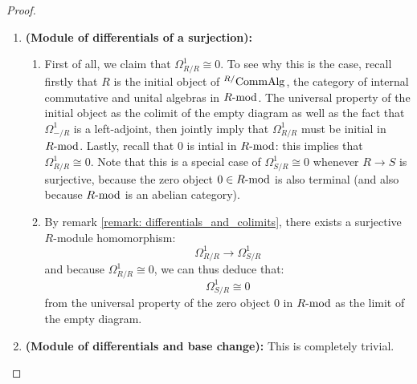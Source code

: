                 \begin{proof}
                    \noindent
                    \begin{enumerate}
                        \item \textbf{(Module of differentials of a surjection):} 
                            \begin{enumerate}
                                \item First of all, we claim that $\Omega^1_{R/R} \cong 0$. To see why this is the case, recall firstly that $R$ is the initial object of ${}^{R/}\Comm\Alg$, the category of internal commutative and unital algebras in $R\mod$. The universal property of the initial object as the colimit of the empty diagram as well as the fact that $\Omega^1_{-/R}$ is a left-adjoint, then jointly imply that $\Omega^1_{R/R}$ must be initial in $R\mod$. Lastly, recall that $0$ is intial in $R\mod$: this implies that $\Omega^1_{R/R} \cong 0$. Note that this is a special case of $\Omega^1_{S/R} \cong 0$ whenever $R \to S$ is surjective, because the zero object $0 \in R\mod$ is also terminal (and also because $R\mod$ is an abelian category).
                                \item By remark \ref{remark: differentials_and_colimits}, there exists a surjective $R$-module homomorphism:
                                    $$\Omega^1_{R/R} \to \Omega^1_{S/R}$$
                                and because $\Omega^1_{R/R} \cong 0$, we can thus deduce that:
                                    $$\Omega^1_{S/R} \cong 0$$
                                from the universal property of the zero object $0$ in $R\mod$ as the limit of the empty diagram.
                            \end{enumerate}
                        \item \textbf{(Module of differentials and base change):} This is completely trivial.
                    \end{enumerate}
                \end{proof}
                
